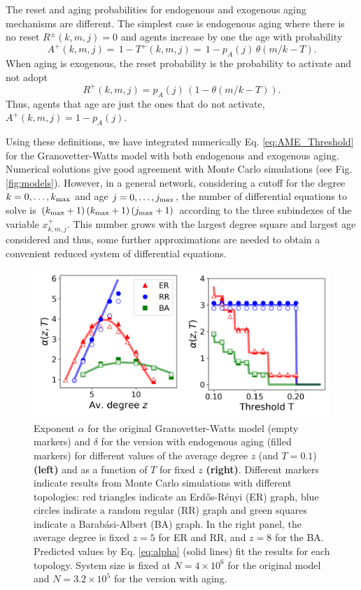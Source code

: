 The reset and aging probabilities for endogenous and exogenous aging mechanisms are different. The simplest case is endogenous aging where there is no reset $R^{\pm} (k,m,j) = 0$ and agents increase by one the age with probability 
\begin{equation}
A^{+} (k,m,j) = \,  1 - T^{+}(k,m,j) = \, 1 - p_{A}(j)\, \theta \left( m/k - T \right).
\end{equation}
When aging is exogenous, the reset probability is the probability to activate and not adopt 
\begin{equation}
R^{+} (k,m,j) = p_A (j)\, \left(1 - \theta \left(m/k - T\right)\right). 
\end{equation}
Thus, agents that age are just the ones that do not activate, $A^{+} (k,m,j) = 1 - p_A(j)$.

Using these definitions, we have integrated numerically Eq. \eqref{eq:AME_Threshold} for the Granovetter-Watts model with both endogenous and exogenous aging. Numerical solutions give  good agreement with Monte Carlo simulations (see Fig. \ref{fig:models}). However, in a general network, considering a cutoff for the degree $k = 0,\dots,k_{\rm{max}}$ and age $j = 0,\dots,j_{\rm{max}}$, the number of differential equations to solve is $(k_{\rm{max}} + 1)\, (k_{\rm{max}} + 1)\, (j_{\rm{max}} + 1)$ according to the three subindexes of the variable $x^{+}_{k,m,j}$. This number grows with the largest degree square and largest age considered and thus, some further approximations are needed to obtain a convenient reduced system of differential equations. 

\begin{figure}
    \centering \captionsetup{font=sf}
    \includegraphics[width=0.7\columnwidth]{Figs/Aging_Threshold/ENDO.pdf}
    \caption[Exponent for the Granovetter-Watts model]{\label{fig:endo_exp} Exponent $\alpha$ for the original Granovetter-Watts model (empty markers) and $\delta$ for the version with endogenous aging (filled markers) for different values of the average degree $z$ (and $T = 0.1$) \textbf{(left)} and as a function of $T$ for fixed $z$ \textbf{(right)}. Different markers indicate results from Monte Carlo simulations with different topologies: red triangles indicate an Erd\H{o}s-R\'enyi (ER) graph, blue circles indicate a random regular (RR) graph and green squares indicate a Barab\'asi-Albert (BA) graph. In the right panel, the average degree is fixed $z = 5$ for ER and RR, and $z = 8$ for the BA. Predicted values by Eq. \eqref{eq:alpha} (solid lines) fit the results for each topology. System size is fixed at $N = 4 \times 10^6$ for the original model and $N = 3.2 \times 10^5$ for the version with aging.}
\end{figure}

